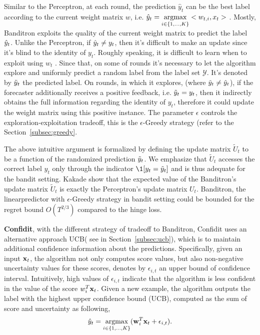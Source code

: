 Similar to the Perceptron, at each round, the prediction $\hat{y}_t$ can be the best label according to the current weight matrix $w$, i.e. $\hat{y}_t = \underset{i\in \{1,\dots,K\}}{\text{argmax}}<w_{t,i},x_t>$ . Mostly, Banditron exploits the quality of the current weight matrix to predict the label $\hat{y}_t$. Unlike the Perceptron, if $\hat{y}_t \neq y_t$, then it's difficult  to make an update since it's blind to the identity of $y_t$. Roughly speaking, it is difficult to learn when to exploit using $w_t$ . Since that, on some of rounds it's necessary to let the algorithm explore and uniformly predict a random label from the label set $\mathscr{Y}$. It's denoted by $\tilde{y}_t$ the predicted label. On rounds, in which it explores, (where $\tilde{y}_t \neq \hat{y}_t$), if the forecaster additionally receives a positive feedback, i.e. $\tilde{y}_t = y_t$, then it indirectly obtains the full information regarding the identity of $y_t$, therefore it could update the weight matrix using this positive instance. The parameter $\epsilon$ controls the exploration-exploitation tradeoff, this is the $\epsilon$-Greedy strategy (refer to the Section~\ref{subsec:greedy}. 

The above intuitive argument is formalized by defining the update matrix $\tilde{U}_t$ to be a function of the randomized prediction $\tilde{y}_t$. We emphasize that $\tilde{U}_t$ accesses the correct label $y_t$ only through the indicator $\1[y_t = \ty] $ and is thus adequate for the bandit setting. Kakade\cite{kakade2008efficient} show that the expected value of the Banditron's  update matrix $\tilde{U}_t$ is exactly the Perceptron's update matrix $U_t$.  Banditron, the linearpredictor with $\epsilon$-Greedy strategy in bandit setting could be bounded for the regret bound $O(T^{2/3})$ compared to the hinge loss.

\vspace{3ex}
\textbf{Confidit}\cite{MCBFCRAMMER}, with the different strategy of tradeoff to Banditron, Confidit uses an alternative approach UCB( see in Section~\ref{subsec:ucb}), which is to maintain additional confidence information about the predictions. Specifically, given an input $\mathbf{x}_t$, the algorithm not only computes score values, but also non-negative uncertainty values for these scores, denotes by $\epsilon_{i,t}$ an upper bound of confidence interval. Intuitively, high values of $\epsilon_{i,t}$ indicate that the algorithm is less confident in the value of the score $w_i^T \mathbf{x}_t$. Given a new example, the algorithm outputs the label with the highest upper confidence bound (UCB), computed as the sum of score and uncertainty as following, 
\[\hat{y}_t = \underset{i\in \{1,\dots,K\}}{\text{argmax}} (\mathbf{w}_i^T \mathbf{x}_t + \epsilon_{i,t}).\] 

